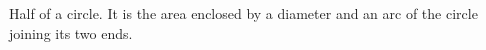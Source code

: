 Half of a circle.  It is the area enclosed by a diameter and an arc of the circle joining 
its two ends.